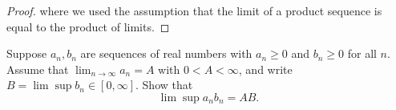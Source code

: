 \begin{proof}
where we used the assumption that the limit of a product sequence is equal to the product of limits.




\end{proof}

\begin{lemma}\label{ra.425b.hw4.lemma.3}

Suppose $a_n, b_n$ are sequences of real numbers with $a_n \geq 0$ and $b_n \geq 0$ for all $n$. Assume that $\lim_{n \to \infty} a_n = A$ with $0 < A < \infty$, and write $B = \lim \sup b_n \in [0,\infty]$. Show that
\[
\lim \sup a_n b_n = AB.
\]

\end{lemma}

